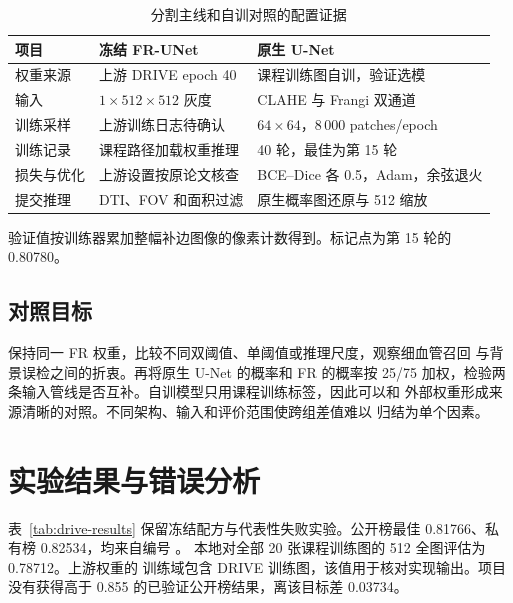 \begin{table}[H]
\centering\small
\caption{分割主线和自训对照的配置证据}\label{tab:drive-cfg}
\begin{tabularx}{\linewidth}{@{}P{35mm}YY@{}}
\toprule
项目 & 冻结 FR-UNet & 原生 U-Net \\
\midrule
权重来源 & 上游 DRIVE epoch 40 & 课程训练图自训，验证选模 \\
输入 & $1\times512\times512$ 灰度 & CLAHE 与 Frangi 双通道 \\
训练采样 & 上游训练日志待确认 & $64\times64$，8\,000 patches/epoch \\
训练记录 & 课程路径加载权重推理 & 40 轮，最佳为第 15 轮 \\
损失与优化 & 上游设置按原论文核查 & BCE--Dice 各 0.5，Adam，余弦退火 \\
提交推理 & DTI、FOV 和面积过滤 & 原生概率图还原与 512 缩放 \\
\bottomrule
\end{tabularx}
\end{table}
{验证值按训练器累加整幅补边图像的像素计数得到。标记点为第 15 轮的 0.80780。}

\subsection{对照目标}
保持同一 FR 权重，比较不同双阈值、单阈值或推理尺度，观察细血管召回
与背景误检之间的折衷。再将原生 U-Net 的概率和 FR 的概率按 25/75
加权，检验两条输入管线是否互补。自训模型只用课程训练标签，因此可以和
外部权重形成来源清晰的对照。不同架构、输入和评价范围使跨组差值难以
归结为单个因素。

\section{实验结果与错误分析}
表~\ref{tab:drive-results} 保留冻结配方与代表性失败实验。公开榜最佳
0.81766、私有榜 0.82534，均来自编号 。
本地对全部 20 张课程训练图的 512 全图评估为 0.78712。上游权重的
训练域包含 DRIVE 训练图，该值用于核对实现输出。项目没有获得高于
0.855 的已验证公开榜结果，离该目标差 0.03734。


